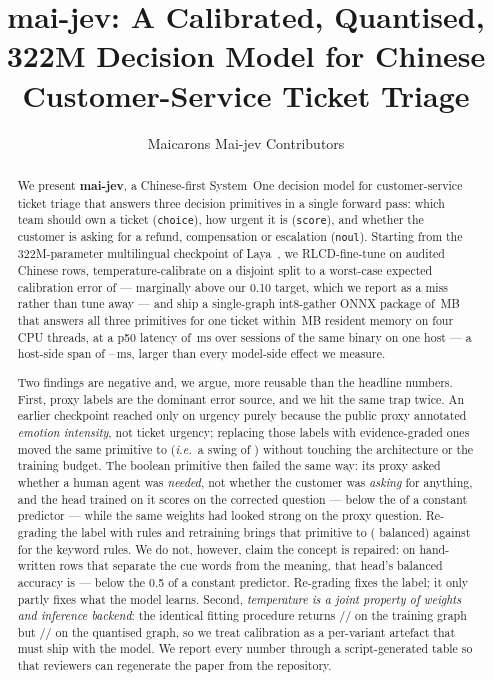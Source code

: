 \documentclass[11pt,a4paper]{article}
\title{\textbf{mai-jev}: A Calibrated, Quantised, 322M Decision Model for Chinese Customer-Service Ticket Triage}
\author{Maicarons Mai-jev Contributors}
\date{}
\newcommand{\ie}{\emph{i.e.}}
\begin{document}
\maketitle

\begin{abstract}
We present \textbf{mai-jev}, a Chinese-first System~One decision model for customer-service ticket triage that answers three decision primitives in a single forward pass: which team should own a ticket (\texttt{choice}), how urgent it is (\texttt{score}), and whether the customer is asking for a refund, compensation or escalation (\texttt{noul}). Starting from the 322M-parameter multilingual checkpoint of Laya~\cite{laya}, we RLCD-fine-tune on \DataTotalRows{} audited Chinese rows, temperature-calibrate on a disjoint split to a worst-case expected calibration error of \WorstEce{} --- marginally above our \num{0.10} target, which we report as a miss rather than tune away --- and ship a single-graph int8-gather ONNX package of \ModelMb\,MB that answers all three primitives for one ticket within \RssMb\,MB resident memory on four CPU threads, at a p50 latency of \LatPFiveZeroMedian\,ms over \LatSessions{} sessions of the same binary on one host --- a host-side span of \LatPFiveZeroBest--\LatPFiveZeroWorst\,ms, larger than every model-side effect we measure.

Two findings are negative and, we argue, more reusable than the headline numbers. First, proxy labels are the dominant error source, and we hit the same trap twice. An earlier checkpoint reached only \AccScoreVZeroTwo{} on urgency purely because the public proxy annotated \emph{emotion intensity}, not ticket urgency; replacing those labels with evidence-graded ones moved the same primitive to \AccScore{} (\ie\ a swing of \DeltaUrg) without touching the architecture or the training budget. The boolean primitive then failed the same way: its proxy asked whether a human agent was \emph{needed}, not whether the customer was \emph{asking} for anything, and the head trained on it scores \OldHeadAccNoul{} on the corrected question --- below the \MajAccNoul{} of a constant predictor --- while the same weights had looked strong on the proxy question. Re-grading the label with rules and retraining brings that primitive to \AccNoul{} (\BAccNoul{} balanced) against \RulesBAccNoul{} for the keyword rules. We do not, however, claim the concept is repaired: on \AntibodyN{} hand-written rows that separate the cue words from the meaning, that head's balanced accuracy is \AntibodyBAcc{} --- below the \num{0.5} of a constant predictor. Re-grading fixes the label; it only partly fixes what the model learns. Second, \emph{temperature is a joint property of weights and inference backend}: the identical fitting procedure returns \TChoice/\TScore/\TNoul{} on the training graph but \TChoiceOnnx/\TScoreOnnx/\TNoulOnnx{} on the quantised graph, so we treat calibration as a per-variant artefact that must ship with the model. We report every number through a script-generated table so that reviewers can regenerate the paper from the repository.
\end{abstract}
\end{document}
